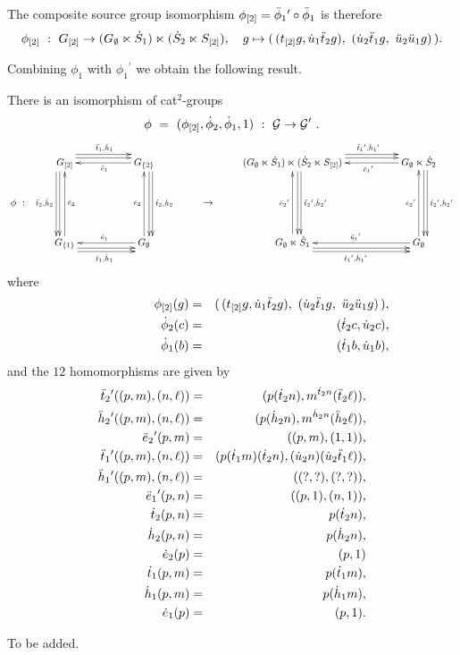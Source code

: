 \noindent
The composite source group isomorphism $\phi_{[2]} = \ddot{\phi}_1{}^{\prime} \circ \ddot{\phi}_1$ 
is therefore
$$
\phi_{[2]} ~:~ G_{[2]} \to (G_{\emptyset} \ltimes \dot{S}_1) \ltimes (\dot{S}_2 \ltimes S_{[2]}), 
\quad g \mapsto 
      (\,(t_{[2]} g,\dot{u}_1\ddot{t}_2 g),~(\dot{u}_2\ddot{t}_1 g,~\ddot{u}_2\ddot{u}_1 g)\,).
$$

\bigskip\noindent
Combining $\phi_1$ with $\phi_1{}^{\prime}$ we obtain the following result.
\begin{thm}
There is an isomorphism of cat$^2$-groups
$$
\phi ~=~ (\phi_{[2]},\dot{\phi}_2,\dot{\phi}_1,1) ~:~ \mathcal{G} \to \mathcal{G}'~.
$$
$$
\xymatrix @C=2pc @R=2pc{
   & \GGot \ar[dd] <-1.2ex>  \ar[dd] <-2.0ex>_{\ddttt,\ddhht}
     \ar[rr] <+1.2ex>  \ar[rr] <+2.0ex>^{\ddtto,\ddhho}
    && \GGbt  \ar[ll]^{\ddeeo}
       \ar[dd]<+1.2ex>  \ar[dd] <+2.0ex>^{\dttt,\dhht}  
      &&  (\GGe \ltimes \dSSo) \ltimes (\dSSt \ltimes \SSot) 
           \ar[dd] <+1.2ex>  \ar[dd] <+2.0ex>^{\ddtttd,\ddhhtd} 
           \ar[rr] <+1.2ex>  \ar[rr] <+2.0ex>^(0.6){\ddttod,\ddhhod}       
        && \GGe \ltimes \dSSt  \ar[ll]^(0.4){\ddeeod}
           \ar[dd]<+1.2ex>  \ar[dd] <+2.0ex>^{\dtttd,\dhhtd} \\
\phi~: 
   &&&& \qquad\to
       &&&                                                   \\
   & \GGbo \ar[uu]_{\ddeet}
     \ar[rr] <-1.2ex>  \ar[rr] <-2.0ex>_{\dtto,\dhho} 
    && \GGe \ar[uu]^{\deet}   \ar[ll]_{\deeo} 
      && \GGe \ltimes \dSSo  \ar[uu]^{\ddeetd} 
         \ar[rr] <-1.2ex>  \ar[rr] <-2.0ex>_{\dttod,\dhhod} 
        && \GGe  \ar[uu]^{\deetd}  \ar[ll]_{\ddeeod}         \\
}
$$
where
\begin{eqnarray*}
\qquad\qquad\qquad~
\phi_{[2]}(g) &=& (\,(t_{[2]} g,\dot{u}_1\ddot{t}_2 g),~(\dot{u}_2\ddot{t}_1 g,~\ddot{u}_2\ddot{u}_1 g)\,),\\
\dot{\phi}_2(c) &=& (\dot{t}_2 c, \dot{u}_2 c),\\
\dot{\phi}_1(b) &=& (\dot{t}_1 b, \dot{u}_1 b),
\end{eqnarray*}
and the $12$ homomorphisms are given by
\begin{eqnarray*}
\ddot{t}_2{}^{\prime}((p,m),(n,\ell)) 
  &=& (p(\dot{t}_2 n),m^{\dot{t}_2 n}(\ddot{t}_2\ell)),\\
\ddot{h}_2{}^{\prime}((p,m),(n,\ell)) 
  &=& (p(\dot{h}_2 n),m^{\dot{h}_2 n}(\ddot{h}_2\ell)),\\
\ddot{e}_2{}^{\prime}(p,m) 
  &=& ((p,m),(1,1)), \\
\ddot{t}_1{}^{\prime}((p,m),(n,\ell)) 
  &=& (p(\dot{t}_1 m)(\dot{t}_2 n),(\dot{u}_2 n)(\dot{u}_2\ddot{t}_1\ell)),\\
\ddot{h}_1{}^{\prime}((p,m),(n,\ell)) 
  &=& ((?,?),(?,?)),\\
\ddot{e}_1{}^{\prime}(p,n) 
  &=& ((p,1),(n,1)), \\
\dot{t}_2(p,n)  &=& p(\dot{t}_2 n),\\
\dot{h}_2(p,n)  &=& p(\dot{h}_2 n),\\
\dot{e}_2(p) &=& (p,1) \\
\dot{t}_1(p,m)  &=& p(\dot{t}_1 m),\\
\dot{h}_1(p,m)  &=& p(\dot{h}_1 m),\\
\dot{e}_1(p) &=& (p,1).
\end{eqnarray*}
\end{thm}
\begin{pf}
To be added.
\end{pf}

